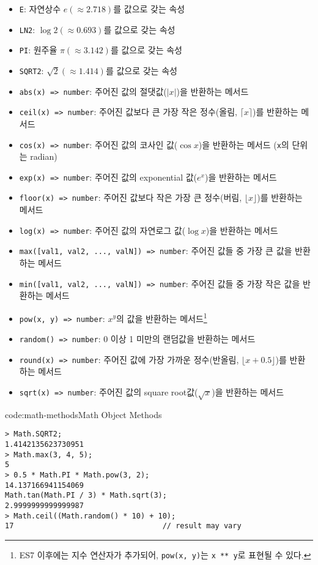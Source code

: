 \begin{itemize}
    \item \texttt{E}: 자연상수 $e (\approx 2.718)$를 값으로 갖는 속성
    \item \texttt{LN2}: $\log 2 (\approx 0.693)$를 값으로 갖는 속성
    \item \texttt{PI}: 원주율 $\pi (\approx 3.142)$를 값으로 갖는 속성
    \item \texttt{SQRT2}: $\sqrt 2 (\approx 1.414)$를 값으로 갖는 속성
    \item \texttt{abs(x) => number}: 주어진 값의 절댓값($|x|$)을 반환하는 메서드
    \item \texttt{ceil(x) => number}: 주어진 값보다 큰 가장 작은 정수(올림, $\lceil x\rceil$)를 반환하는 메서드
    \item \texttt{cos(x) => number}: 주어진 값의 코사인 값($\cos x$)을 반환하는 메서드 (\texttt{x}의 단위는 radian)
    \item \texttt{exp(x) => number}: 주어진 값의 exponential 값($e^x$)을 반환하는 메서드
    \item \texttt{floor(x) => number}: 주어진 값보다 작은 가장 큰 정수(버림, $\lfloor x\rfloor$)를 반환하는 메서드
    \item \texttt{log(x) => number}: 주어진 값의 자연로그 값($\log x$)을 반환하는 메서드
    \item \texttt{max([val1, val2, ..., valN]) => number}: 주어진 값들 중 가장 큰 값을 반환하는 메서드
    \item \texttt{min([val1, val2, ..., valN]) => number}: 주어진 값들 중 가장 작은 값을 반환하는 메서드
    \item \texttt{pow(x, y) => number}: $x^y$의 값을 반환하는 메서드\footnote{ES7 이후에는 지수 연산자가 추가되어, \texttt{pow(x, y)}는 \texttt{x ** y}로 표현될 수 있다.}
    \item \texttt{random() => number}: 0 이상 1 미만의 랜덤값을 반환하는 메서드
    \item \texttt{round(x) => number}: 주어진 값에 가장 가까운 정수(반올림, $\lfloor x + 0.5\rfloor$)를 반환하는 메서드
    \item \texttt{sqrt(x) => number}: 주어진 값의 square root값($\sqrt{x}$)을 반환하는 메서드
\end{itemize}

\begin{codeenv}{code:math-methods}{Math Object Methods}\begin{verbatim}
> Math.SQRT2;
1.4142135623730951
> Math.max(3, 4, 5);
5
> 0.5 * Math.PI * Math.pow(3, 2);
14.137166941154069
Math.tan(Math.PI / 3) * Math.sqrt(3);
2.9999999999999987
> Math.ceil((Math.random() * 10) + 10);
17                                  // result may vary
\end{verbatim}
\end{codeenv}
